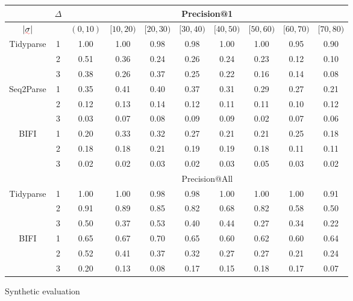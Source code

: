 \documentclass[sigplan,review,acmsmall,nonacm,anonymous]{acmart}\settopmatter{printfolios=false,printccs=false,printacmref=false}
\begin{document}
  \begin{table}[!h]
    \centering
    \begin{tabular}{c|c|cccccccc}
      \hline\hline
      & $\Delta$ & \multicolumn{8}{c}{Precision@1} \\ \hline
      $|\err\sigma|$ &  & $(0,10)$ & $[10,20)$ & $[20,30)$ & $[30, 40)$ & $[40,50)$ & $[50, 60)$ & $[60,70)$ & $[70, 80)$ \\ \hline
      Tidyparse
      & 1 & 1.00 & 1.00 & 0.98 & 0.98 & 1.00 & 1.00 & 0.95 & 0.90 \\
      & 2 & 0.51 & 0.36 & 0.24 & 0.26 & 0.24 & 0.23 & 0.12 & 0.10 \\
      & 3 & 0.38 & 0.26 & 0.37 & 0.25 & 0.22 & 0.16 & 0.14 & 0.08 \\ \hline
      Seq2Parse
      & 1 & 0.35 & 0.41 & 0.40 & 0.37 & 0.31 & 0.29 & 0.27 & 0.21 \\
      & 2 & 0.12 & 0.13 & 0.14 & 0.12 & 0.11 & 0.11 & 0.10 & 0.12 \\
      & 3 & 0.03 & 0.07 & 0.08 & 0.09 & 0.09 & 0.02 & 0.07 & 0.06 \\ \hline
      BIFI
      & 1 & 0.20 & 0.33 & 0.32 & 0.27 & 0.21 & 0.21 & 0.25 & 0.18 \\
      & 2 & 0.18 & 0.18 & 0.21 & 0.19 & 0.19 & 0.18 & 0.11 & 0.11 \\
      & 3 & 0.02 & 0.02 & 0.03 & 0.02 & 0.03 & 0.05 & 0.03 & 0.02 \\ \hline
      & & \multicolumn{8}{c}{Precision@All} \\ \hline
      Tidyparse
      & 1 & 1.00 & 1.00 & 0.98 & 0.98 & 1.00 & 1.00 & 1.00 & 0.91 \\
      & 2 & 0.91 & 0.89 & 0.85 & 0.82 & 0.68 & 0.82 & 0.58 & 0.50 \\
      & 3 & 0.50 & 0.37 & 0.53 & 0.40 & 0.44 & 0.27 & 0.34 & 0.22 \\ \hline
      BIFI
      & 1 & 0.65 & 0.67 & 0.70 & 0.65 & 0.60 & 0.62 & 0.60 & 0.64 \\
      & 2 & 0.52 & 0.41 & 0.37 & 0.32 & 0.27 & 0.27 & 0.21 & 0.24 \\
      & 3 & 0.20 & 0.13 & 0.08 & 0.17 & 0.15 & 0.18 & 0.17 & 0.07 \\ \hline\hline
    \end{tabular}
  \end{table}

  Synthetic evaluation
\end{document}
